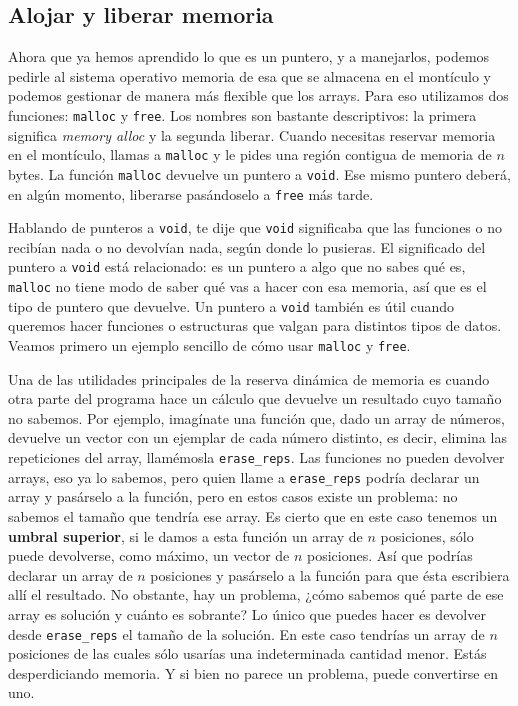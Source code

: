 \documentclass[a4paper]{article}
\begin{document}
\subsection{Alojar y liberar memoria}
Ahora que ya hemos aprendido lo que es un puntero, y a manejarlos, podemos
pedirle al sistema operativo memoria de esa que se almacena en el montículo y
podemos gestionar de manera más flexible que los arrays. Para eso utilizamos
dos funciones: \verb!malloc! y \verb!free!. Los nombres son bastante
descriptivos: la primera significa \textit{memory alloc} y la segunda liberar.
Cuando necesitas reservar memoria en el montículo, llamas a \verb!malloc!
y le pides una región contigua de memoria de $n$ bytes. La función \verb!malloc!
devuelve un puntero a \verb!void!. Ese mismo puntero deberá, en algún momento,
liberarse pasándoselo a \verb!free! más tarde.


Hablando de punteros a \verb!void!, te dije que \verb!void! significaba que
las funciones o no recibían nada o no devolvían nada, según donde lo pusieras.
El significado del puntero a \verb!void! está relacionado: es un puntero a algo
que no sabes qué es, \verb!malloc! no tiene modo de saber qué vas a hacer con
esa memoria, así que es el tipo de puntero que devuelve. Un puntero a
\verb!void! también es útil cuando queremos hacer funciones o estructuras que
valgan para distintos tipos de datos. Veamos primero un ejemplo sencillo de
cómo usar \verb!malloc! y \verb!free!.

Una de las utilidades principales de la reserva dinámica de memoria es cuando
otra parte del programa hace un cálculo que devuelve un resultado cuyo tamaño
no sabemos. Por ejemplo, imagínate una función que, dado un array de números,
devuelve un vector con un ejemplar de cada número distinto, es decir, elimina
las repeticiones del array, llamémosla \verb!erase_reps!.
Las funciones no pueden devolver arrays,
eso ya lo sabemos, pero quien llame a \verb!erase_reps! podría declarar un array
y pasárselo a la función, pero en estos casos existe un problema: no sabemos
el tamaño que tendría ese array. Es cierto que en este caso tenemos un
\textbf{umbral superior}, si le damos a esta función un array de $n$ posiciones,
sólo puede devolverse, como máximo, un vector de $n$ posiciones. Así que podrías
declarar un array de $n$ posiciones y pasárselo a la función para que ésta
escribiera allí el resultado. No obstante, hay un problema, ¿cómo sabemos qué
parte de ese array es solución y cuánto es sobrante? Lo único que puedes hacer es
devolver desde \verb!erase_reps! el tamaño de la solución. En este caso tendrías
un array de $n$ posiciones de las cuales sólo usarías una indeterminada cantidad
menor. Estás desperdiciando memoria. Y si bien no parece un problema,
puede convertirse en uno.
\end{document}
